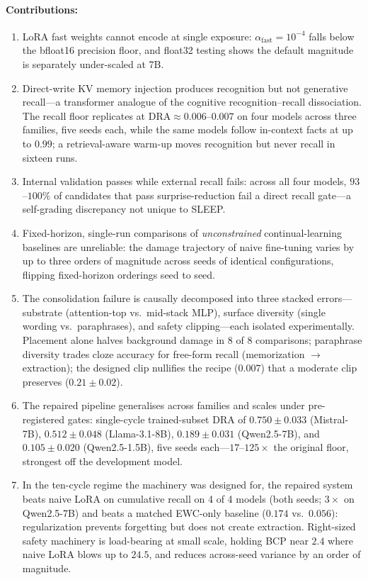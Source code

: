 \paragraph{Contributions:}
\begin{enumerate}[label=(C\arabic*),itemsep=0.15em,topsep=0.2em,leftmargin=*]
    \item LoRA fast weights cannot encode at single exposure: $\alpha_{\mathrm{fast}} = 10^{-4}$ falls below the bfloat16 precision floor, and float32 testing shows the default magnitude is separately under-scaled at 7B.
    \item Direct-write KV memory injection produces recognition but not generative recall---a transformer analogue of the cognitive recognition--recall dissociation. The recall floor replicates at $\mathrm{DRA} \approx 0.006$--$0.007$ on four models across three families, five seeds each, while the same models follow in-context facts at up to $0.99$; a retrieval-aware warm-up moves recognition but never recall in sixteen runs.
    \item Internal validation passes while external recall fails: across all four models, $93$--$100\%$ of candidates that pass surprise-reduction fail a direct recall gate---a self-grading discrepancy not unique to SLEEP.
    \item Fixed-horizon, single-run comparisons of \emph{unconstrained} continual-learning baselines are unreliable: the damage trajectory of naive fine-tuning varies by up to three orders of magnitude across seeds of identical configurations, flipping fixed-horizon orderings seed to seed.
    \item The consolidation failure is causally decomposed into three stacked errors---substrate (attention-top vs.\ mid-stack MLP), surface diversity (single wording vs.\ paraphrases), and safety clipping---each isolated experimentally. Placement alone halves background damage in 8 of 8 comparisons; paraphrase diversity trades cloze accuracy for free-form recall (memorization $\to$ extraction); the designed clip nullifies the recipe ($0.007$) that a moderate clip preserves ($0.21 \pm 0.02$).
    \item The repaired pipeline generalises across families and scales under pre-registered gates: single-cycle trained-subset DRA of $0.750 \pm 0.033$ (Mistral-7B), $0.512 \pm 0.048$ (Llama-3.1-8B), $0.189 \pm 0.031$ (Qwen2.5-7B), and $0.105 \pm 0.020$ (Qwen2.5-1.5B), five seeds each---$17$--$125\times$ the original floor, strongest off the development model.
    \item In the ten-cycle regime the machinery was designed for, the repaired system beats naive LoRA on cumulative recall on 4 of 4 models (both seeds; $3\times$ on Qwen2.5-7B) and beats a matched EWC-only baseline ($0.174$ vs.\ $0.056$): regularization prevents forgetting but does not create extraction. Right-sized safety machinery is load-bearing at small scale, holding BCP near $2.4$ where naive LoRA blows up to $24.5$, and reduces across-seed variance by an order of magnitude.
\end{enumerate}

